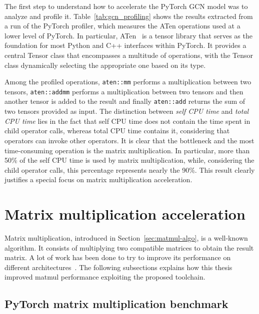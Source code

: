 The first step to understand how to accelerate the PyTorch GCN model was to analyze and profile it.
Table~\ref{tab:gcn_profiling} shows the results extracted from a run of the PyTorch profiler, which measures the ATen operations used at a lower level of PyTorch.
In particular, ATen~\cite{aten} is a tensor library that serves as the foundation for most Python and C++ interfaces within PyTorch.
It provides a central Tensor class that encompasses a multitude of operations, with the Tensor class dynamically selecting the appropriate one based on its type.

Among the profiled operations, \lstinline{aten::mm} performs a multiplication between two tensors, \lstinline{aten::addmm} performs a multiplication between two tensors and then another tensor is added to the result and finally \lstinline{aten::add} returns the sum of two tensors provided as input.
The distinction between \textit{self CPU time} and \textit{total CPU time} lies in the fact that self CPU time does not contain the time spent in child operator calls, whereas total CPU time contains it, considering that operators can invoke other operators.
It is clear that the bottleneck and the most time-consuming operation is the matrix multiplication.
In particular, more than 50\% of the self CPU time is used by matrix multiplication, while, considering the child operator calls, this percentage represents nearly the 90\%.
This result clearly justifies a special focus on matrix multiplication acceleration.

\section{Matrix multiplication acceleration}
\label{sec:matmul-acceleration}%

Matrix multiplication, introduced in Section~\ref{sec:matmul-algo}, is a well-known algorithm.
It consists of multiplying two compatible matrices to obtain the result matrix.
A lot of work has been done to try to improve its performance on different architectures~\cite{DBLP:journals/corr/abs-2003-00532, opt_cuda_matmul}.
The following subsections explains how this thesis improved matmul performance exploiting the proposed toolchain.

\subsection{PyTorch matrix multiplication benchmark}
\label{subsec:pytorch-matmul-bench}%

